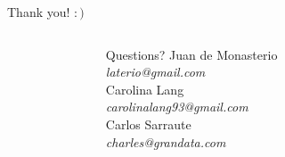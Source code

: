 \documentclass{beamer}
\begin{document}
%   	
%
%
%	
%	 
%	
%   





\begin{frame}{Thank you! $:)$}
	\begin{columns}
		\begin{column}{0.20 \textwidth}
		\end{column}
		
		\begin{column}{0.55 \textwidth}
			
			\begin{block}{Questions?}
				\center
				Juan de Monasterio \\
				\textit{laterio@gmail.com} \\
				\bigskip
				Carolina Lang \\
				\textit{carolinalang93@gmail.com} \\
				\bigskip				
				Carlos Sarraute \\
				\textit{charles@grandata.com} \\
				
				
			\end{block}
		\end{column}
		\begin{column}{0.20 \textwidth}
		\end{column}
	\end{columns}
	
\end{frame}



\justifying%





\vfill
\end{document}
